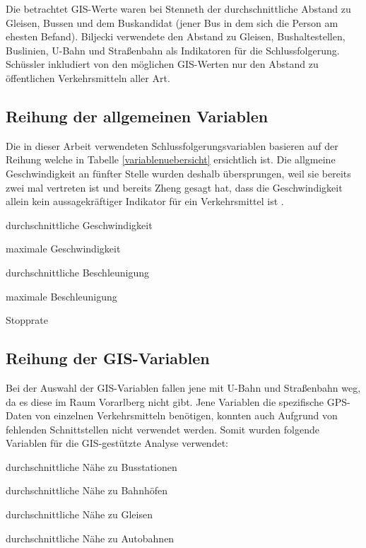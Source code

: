 Die betrachtet GIS-Werte waren bei Stenneth \cite{stenneth_transportation_2011} der durchschnittliche Abstand zu Gleisen, Bussen und dem Buskandidat (jener Bus in dem sich die Person am ehesten Befand). Biljecki verwendete den Abstand zu Gleisen, Bushaltestellen, Buslinien, U-Bahn und Straßenbahn als Indikatoren für die Schlussfolgerung. Schüssler \cite{nadine_schussler_improving_2011} inkludiert von den möglichen GIS-Werten nur den Abstand zu öffentlichen Verkehrsmitteln aller Art.

\subsection{Reihung der allgemeinen Variablen}
Die in dieser Arbeit verwendeten Schlussfolgerungsvariablen basieren auf der Reihung welche in Tabelle \ref{variablenuebersicht} ersichtlich ist. Die allgmeine Geschwindigkeit an fünfter Stelle wurden deshalb übersprungen, weil sie bereits zwei mal vertreten ist und bereits Zheng gesagt hat, dass die Geschwindigkeit allein kein aussagekräftiger Indikator für ein Verkehrsmittel ist \cite{zheng_understanding_2010}. 

\begin{pitemize}
\item durchschnittliche Geschwindigkeit
\item maximale Geschwindigkeit
\item durchschnittliche Beschleunigung
\item maximale Beschleunigung
\item Stopprate
\end{pitemize}


\subsection{Reihung der GIS-Variablen}
Bei der Auswahl der GIS-Variablen fallen jene mit U-Bahn und Straßenbahn weg, da es diese im Raum Vorarlberg nicht gibt. Jene Variablen die spezifische GPS-Daten von einzelnen Verkehrsmitteln benötigen, konnten auch Aufgrund von fehlenden Schnittstellen nicht verwendet werden. Somit wurden folgende Variablen für die GIS-gestützte Analyse verwendet:

\begin{pitemize}
\item durchschnittliche Nähe zu Busstationen
\item durchschnittliche Nähe zu Bahnhöfen
\item durchschnittliche Nähe zu Gleisen	
\item durchschnittliche Nähe zu Autobahnen
\end{pitemize}
\clearpage

